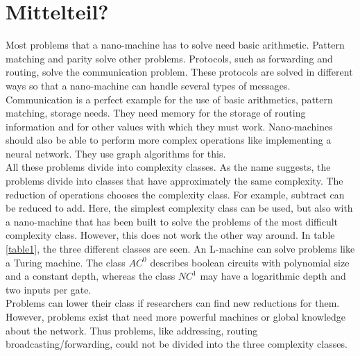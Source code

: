 \documentclass[10pt,sigconf]{acmart}
\begin{document}
\section{Mittelteil?}
Most problems that a nano-machine has to solve need basic arithmetic.
Pattern matching and parity solve other problems.
Protocols, such as forwarding and routing, solve the communication problem. 
These protocols are solved in different ways so that a nano-machine can handle several types of messages.
Communication is a perfect example for the use of basic arithmetics, pattern matching, storage needs.
They need memory for the storage of routing information and for other values with which they must work.
Nano-machines should also be able to perform more complex operations like implementing a neural network.
They use graph algorithms for this.\\
All these problems divide into complexity classes.
As the name suggests, the problems divide into classes that have approximately the same complexity.
The reduction of operations chooses the complexity class. For example, subtract can be reduced to add. 
Here, the simplest complexity class can be used, but also with a nano-machine that has been built to solve the problems of the most difficult complexity class.
However, this does not work the other way around.
In table \ref{table1}, the three different classes are seen.
An L-machine can solve problems like a Turing machine.
The class $AC^0$ describes boolean circuits with polynomial size and a constant depth, whereas the class $NC^1$ may have a logarithmic depth and two inputs per gate.\\ 
Problems can lower their class if researchers can find new reductions for them. 
However, problems exist that need more powerful machines or global knowledge about the network.
Thus problems, like addressing, routing broadcasting/forwarding, could not be divided into the three complexity classes.\\
\end{document}
